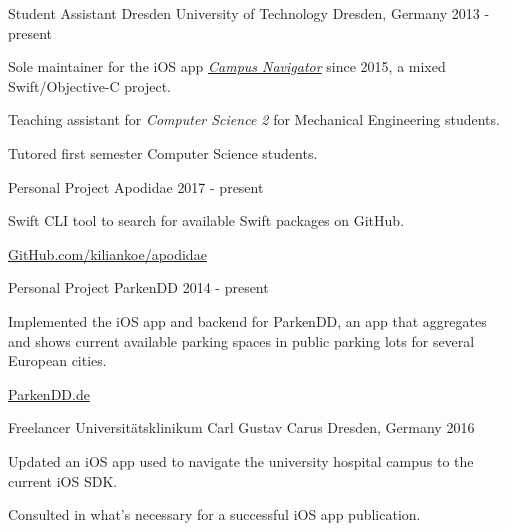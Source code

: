 

\begin{cventries}

\cventry
	{Student Assistant}
	{Dresden University of Technology}
	{Dresden, Germany}
	{2013 - present}
	{
		\begin{cvitems}
			\item {Sole maintainer for the iOS app \href{https://navigator.tu-dresden.de/mobile_apps}{\emph{Campus Navigator}} since 2015, a mixed Swift/Objective-C project.}
			\item {Teaching assistant for \emph{Computer Science 2} for Mechanical Engineering students.}
			\item {Tutored first semester Computer Science students.}
		\end{cvitems}
	}
	
\cventry
	{Personal Project}
	{Apodidae}
	{}
	{2017 - present}
	{
		\begin{cvitems}
			\item {Swift CLI tool to search for available Swift packages on GitHub.}
			\item {\href{https://github.com/kiliankoe/apodidae}{GitHub.com/kiliankoe/apodidae}}
		\end{cvitems}
	}
	
\cventry
	{Personal Project}
	{ParkenDD}
	{}
	{2014 - present}
	{
		\begin{cvitems}
			\item {Implemented the iOS app and backend for ParkenDD, an app that aggregates and shows current available parking spaces in public parking lots for several European cities.}
			\item {\href{https://parkendd.de}{ParkenDD.de}}
		\end{cvitems}
	}
	
\cventry
	{Freelancer}
	{Universitätsklinikum Carl Gustav Carus}
	{Dresden, Germany}
	{2016}
	{
		\begin{cvitems}
			\item {Updated an iOS app used to navigate the university hospital campus to the current iOS SDK.}
			\item {Consulted in what's necessary for a successful iOS app publication.}
		\end{cvitems}
	}
	

\end{cventries}
